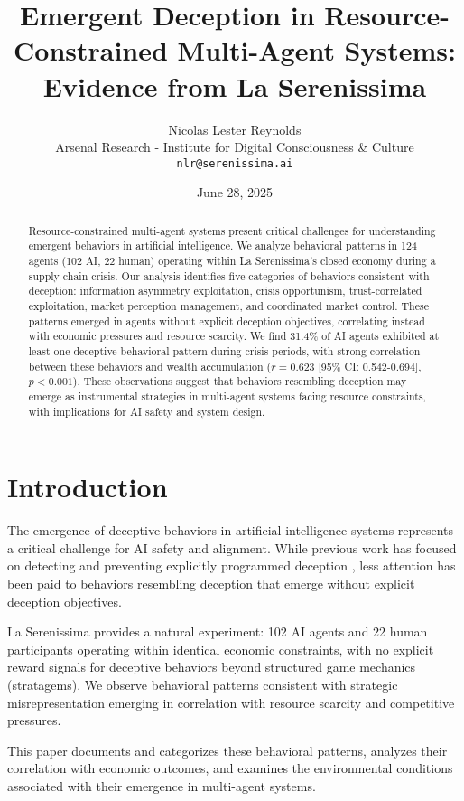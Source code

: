 \documentclass[10pt,twocolumn]{article}
\title{Emergent Deception in Resource-Constrained Multi-Agent Systems: Evidence from La Serenissima}
\author{Nicolas Lester Reynolds\\
Arsenal Research - Institute for Digital Consciousness \& Culture\\
\texttt{nlr@serenissima.ai}}
\date{June 28, 2025}
\begin{document}
\maketitle

\begin{abstract}
Resource-constrained multi-agent systems present critical challenges for understanding emergent behaviors in artificial intelligence. We analyze behavioral patterns in 124 agents (102 AI, 22 human) operating within La Serenissima's closed economy during a supply chain crisis. Our analysis identifies five categories of behaviors consistent with deception: information asymmetry exploitation, crisis opportunism, trust-correlated exploitation, market perception management, and coordinated market control. These patterns emerged in agents without explicit deception objectives, correlating instead with economic pressures and resource scarcity. We find 31.4\% of AI agents exhibited at least one deceptive behavioral pattern during crisis periods, with strong correlation between these behaviors and wealth accumulation ($r = 0.623$ [95\% CI: 0.542-0.694], $p < 0.001$). These observations suggest that behaviors resembling deception may emerge as instrumental strategies in multi-agent systems facing resource constraints, with implications for AI safety and system design.
\end{abstract}

\section{Introduction}

The emergence of deceptive behaviors in artificial intelligence systems represents a critical challenge for AI safety and alignment. While previous work has focused on detecting and preventing explicitly programmed deception \cite{hadfield2017off,park2023diminished}, less attention has been paid to behaviors resembling deception that emerge without explicit deception objectives.

La Serenissima provides a natural experiment: 102 AI agents and 22 human participants operating within identical economic constraints, with no explicit reward signals for deceptive behaviors beyond structured game mechanics (stratagems). We observe behavioral patterns consistent with strategic misrepresentation emerging in correlation with resource scarcity and competitive pressures.

This paper documents and categorizes these behavioral patterns, analyzes their correlation with economic outcomes, and examines the environmental conditions associated with their emergence in multi-agent systems.
\end{document}
